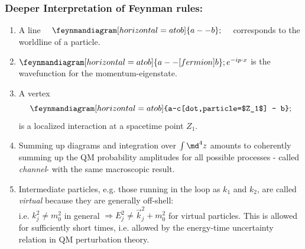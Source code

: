 \subsubsection{Deeper Interpretation of Feynman rules:}
\begin{enumerate}
	\item A line $\quad \feynmandiagram[horizontal=a to b]{a -- b};\quad $ corresponds to the worldline of a particle.
	\item $\feynmandiagram[horizontal=a to b]{a--[fermion]b};e^{-i p\cdot x}$ is the wavefunction for the momentum-eigenstate.
	\item A vertex \[\feynmandiagram[horizontal=a to b]{a--c[dot,particle=$Z_1$] -- b};\] is a localized interaction at a spacetime point $Z_1$.
 	\item Summing up diagrams and integration over $\int \md^4 z$ amounts to coherently summing up the QM probability amplitudes for all possible processes - called \emph{channel}- with the same macroscopic result.
 	\item Intermediate particles, e.g. those running in the loop as $k_1$ and $k_2$, are called \emph{virtual} because they are generally off-shell:\\
 	i.e. $k^2_j \neq m^2_0$ in general $\Rightarrow E^2_j \neq \vec{k}^2_j +m^2_0$ for virtual particles. This is allowed for sufficiently short times, i.e. allowed by the energy-time uncertainty relation in QM perturbation theory.
\end{enumerate}





